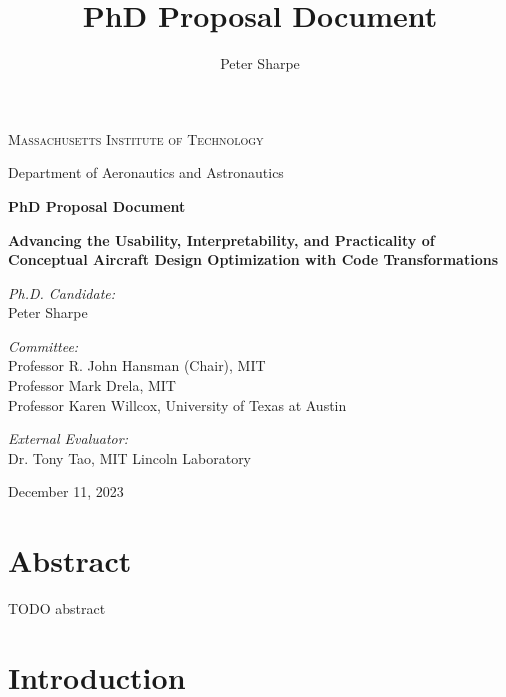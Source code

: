\documentclass[12pt,vi,oneside]{report}
\title{PhD Proposal Document}
\author{Peter Sharpe}
\begin{document}
    \begin{center}

        \vspace*{1cm}

        \textsc{Massachusetts Institute of Technology}

        Department of Aeronautics and Astronautics

        \vspace{1cm}

        \textbf{PhD Proposal Document}

        \vspace{1cm}

        \textbf{\large Advancing the Usability, Interpretability, and Practicality of Conceptual Aircraft Design Optimization with Code Transformations}
        \vspace{1cm}

        \textit{Ph.D. Candidate:}\\
        Peter Sharpe

        \vspace{1cm}

        \textit{Committee:}\\
        Professor R. John Hansman (Chair), MIT\\
        Professor Mark Drela, MIT\\
        Professor Karen Willcox, University of Texas at Austin\\

        \vspace{1cm}

        \textit{External Evaluator:}\\
        Dr. Tony Tao, MIT Lincoln Laboratory

        \vspace{3cm}

        December 11, 2023

    \end{center}

    \chapter*{Abstract}

    TODO abstract


    \tableofcontents


    \chapter{Introduction}
    \label{sec:intro}
\end{document}
